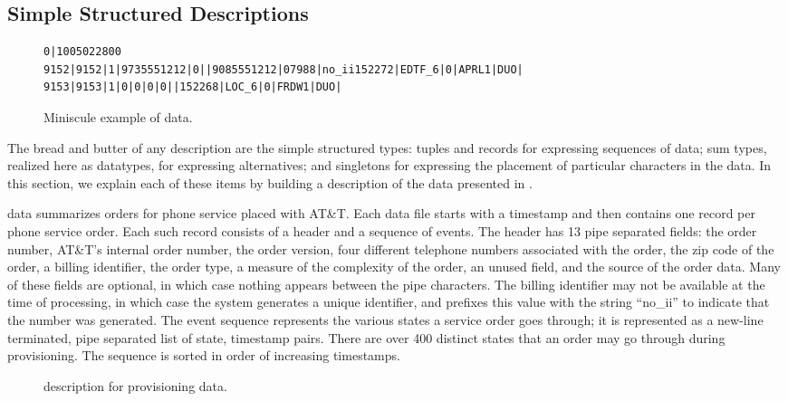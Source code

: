 \subsection{Simple Structured Descriptions}


\begin{figure*}
{\scriptsize
\begin{verbatim}
0|1005022800
9152|9152|1|9735551212|0||9085551212|07988|no_ii152272|EDTF_6|0|APRL1|DUO|
9153|9153|1|0|0|0|0||152268|LOC_6|0|FRDW1|DUO|
\end{verbatim}
}
  \caption{Miniscule example of \dibbler{} data.}
  \label{figure:dibbler-records}
\end{figure*}

The bread and butter of any \padsml{} description are the simple
structured types: tuples and records for expressing sequences of data;
sum types, realized here as datatypes, for expressing alternatives;
and singletons for expressing the placement of particular
characters in the data.  In this section, we explain each of these
items by building a description of the \dibbler{} data presented in
.

\dibbler{} data summarizes orders for phone service placed with AT\&T.
Each \dibbler{} data file starts with a timestamp and then contains one
record per phone service order.
Each such record consists of a header and a sequence of
events.  The header has 13 pipe separated fields: the order number,
AT\&T's internal order number, the order version, four different
telephone numbers associated with the order, the zip code of the
order, a billing identifier, the order type, a measure of the
complexity of the order, an unused field, and the source of the order
data.  Many of these fields are optional, in which case nothing
appears between the pipe characters.  The billing identifier may not
be available at the time of processing, in which case the system
generates a unique identifier, and prefixes this value with the string
``no\_ii'' to indicate that the number was generated. The event sequence
represents the various states a service order goes through; it is
represented as a new-line terminated, pipe separated list of state,
timestamp pairs.  There are over 400 distinct states that an order may
go through during provisioning.  The sequence is sorted in order of
increasing timestamps.

\begin{figure}
  
  \caption{\padsml{} description for \dibbler{} provisioning data.}
  \label{figure:sirius_pml}
\end{figure}

